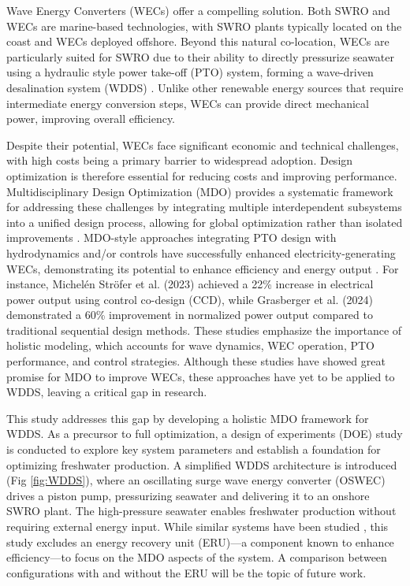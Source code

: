 \documentclass[twocolumn,10pt]{asme2e}
\begin{document}
Wave Energy Converters (WECs) offer a compelling solution. Both SWRO and WECs are marine-based technologies, with SWRO plants typically located on the coast and WECs deployed offshore. Beyond this natural co-location, WECs are particularly suited for SWRO \cite{blue_econ} due to their ability to directly pressurize seawater using a hydraulic style power take-off (PTO) system, forming a wave-driven desalination system (WDDS) \cite{Davies2005}. Unlike other renewable energy sources that require intermediate energy conversion steps, WECs can provide direct mechanical power, improving overall efficiency. 

Despite their potential, WECs face significant economic and technical challenges, with high costs being a primary barrier to widespread adoption. Design optimization is therefore essential for reducing costs and improving performance. Multidisciplinary Design Optimization (MDO) provides a systematic framework for addressing these challenges by integrating multiple interdependent subsystems into a unified design process, allowing for global optimization rather than isolated improvements \cite{Sobieski}. MDO-style approaches integrating PTO design with hydrodynamics and/or controls have successfully enhanced electricity-generating WECs, demonstrating its potential to enhance efficiency and energy output \cite{Stroefer2023,PenaSanchez2022,Rosati2023,Grasberger2024}. For instance, Michelén Ströfer et al. (2023) achieved a 22\% increase in electrical power output using control co-design (CCD), while Grasberger et al. (2024) demonstrated a 60\% improvement in normalized power output compared to traditional sequential design methods. These studies emphasize the importance of holistic modeling, which accounts for wave dynamics, WEC operation, PTO performance, and control strategies. Although these studies have showed great promise for MDO to improve WECs, these approaches have yet to be applied to WDDS, leaving a critical gap in research. 

This study addresses this gap by developing a holistic MDO framework for WDDS. As a precursor to full optimization, a design of experiments (DOE) study is conducted to explore key system parameters and establish a foundation for optimizing freshwater production. A simplified WDDS architecture is introduced (Fig \ref{fig:WDDS}), where an oscillating surge wave energy converter (OSWEC) drives a piston pump, pressurizing seawater and delivering it to an onshore SWRO plant. The high-pressure seawater enables freshwater production without requiring external energy input. While similar systems have been studied \cite{Yu2018,Suchithra2022,Mi2023,Simmons2024}, this study excludes an energy recovery unit (ERU)---a component known to enhance efficiency---to focus on the MDO aspects of the system. A comparison between configurations with and without the ERU will be the topic of future work.
\end{document}
